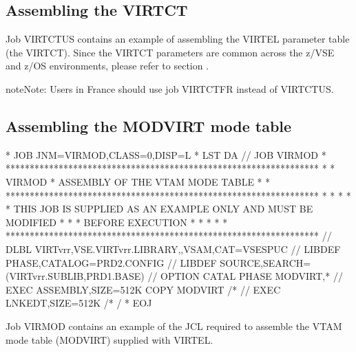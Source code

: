 \documentclass[letterpaper,10pt,english]{sphinxmanual}
\begin{document}
\subsection{Assembling the VIRTCT}
\label{\detokenize{Installation_Guide:assembling-the-virtct}}
Job VIRTCTUS contains an example of assembling the VIRTEL parameter table (the VIRTCT). Since the VIRTCT parameters are common across the z/VSE and z/OS environments, please refer to section {\hyperref[\detokenize{Installation_Guide:vvrrig-virtct}]{}}.

\begin{sphinxadmonition}{note}{Note:}
Users in France should use job VIRTCTFR instead of VIRTCTUS.
\end{sphinxadmonition}


\subsection{Assembling the MODVIRT mode table}
\label{\detokenize{Installation_Guide:assembling-the-modvirt-mode-table}}
\begin{sphinxVerbatim}[commandchars=\\\{\}]
* \PYGZdl{}\PYGZdl{} JOB JNM=VIRMOD,CLASS=0,DISP=L
* \PYGZdl{}\PYGZdl{} LST DA
// JOB VIRMOD
* *****************************************************************
* * VIRMOD * ASSEMBLY OF THE VTAM MODE TABLE *
* *****************************************************************
* * *
* * THIS JOB IS SUPPLIED AS AN EXAMPLE ONLY AND MUST BE MODIFIED *
* * BEFORE EXECUTION *
* * *
* *****************************************************************
// DLBL VIRTvrr,\PYGZsq{}VSE.VIRTvrr.LIBRARY\PYGZsq{},,VSAM,CAT=VSESPUC
// LIBDEF PHASE,CATALOG=PRD2.CONFIG
// LIBDEF SOURCE,SEARCH=(VIRTvrr.SUBLIB,PRD1.BASE)
// OPTION CATAL
  PHASE MODVIRT,*
// EXEC ASSEMBLY,SIZE=512K
  COPY MODVIRT
/*
// EXEC LNKEDT,SIZE=512K
/*
/\PYGZam{}
* \PYGZdl{}\PYGZdl{} EOJ
\end{sphinxVerbatim}


Job VIRMOD contains an example of the JCL required to assemble the VTAM mode table (MODVIRT) supplied with VIRTEL.
\end{document}
